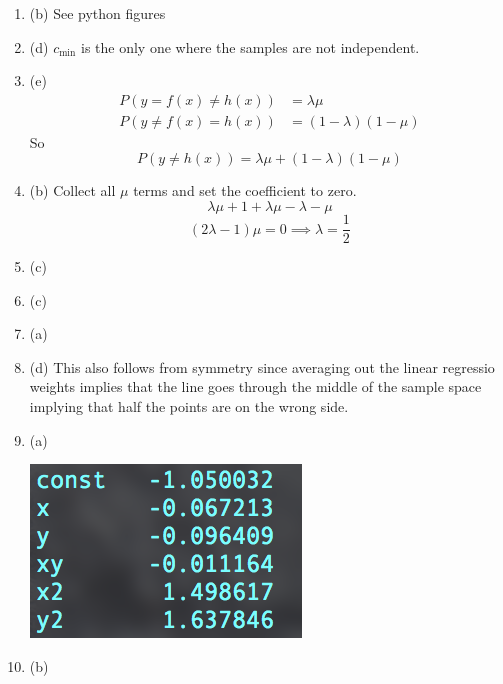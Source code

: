 \documentclass[12pt]{article}
\begin{document}
\begin{enumerate}[leftmargin=*]
\item (b) See python figures
\item (d) $c_{\text{min}}$ is the only one where the samples are not independent.
\item (e)
\begin{align*}
P \left( y = f(x) \neq h(x) \right) &= \lambda \mu \\
P \left( y \neq f(x) = h(x) \right) &= (1 - \lambda) (1 - \mu)
\end{align*}
So
\[ P \left( y \neq h(x) \right) = \lambda \mu + (1 - \lambda) (1 - \mu) \]
\item (b) Collect all $\mu$ terms and set the coefficient to zero.
\[ \lambda \mu + 1 + \lambda \mu - \lambda - \mu \]
\[ (2 \lambda - 1) \mu = 0 \implies \lambda = \frac{1}{2} \]
\item (c)
\item (c)
\item (a)
\item (d) This also follows from symmetry since averaging out the linear regressio weights implies that the line goes through the middle of the sample space implying that half the points are on the wrong side.
\item (a)
\begin{center}
\includegraphics[scale=1]{NonLinearReg}
\end{center}
\item (b)
\end{enumerate}
\end{document}
